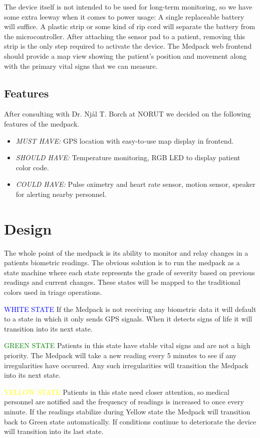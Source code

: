     The device itself is not intended to be used for long-term monitoring, so we have some extra leeway when it comes to power usage: A single replaceable battery will suffice. A plastic strip or some kind of rip cord will separate the battery from the microcontroller. After attaching the sensor pad to a patient, removing this strip is the only step required to activate the device.
    The Medpack web frontend should provide a map view showing the patient's position and movement along with the primary vital signs that we can measure.

    \subsection*{Features}
    After consulting with Dr. Njål T. Borch at NORUT we decided on the following features of the medpack.
    \begin{itemize}
    \item \textit{MUST HAVE:} GPS location with easy-to-use map display in frontend.
    \item \textit{SHOULD HAVE:} Temperature monitoring, RGB LED to display patient color code.
    \item \textit{COULD HAVE:} Pulse oximetry and heart rate sensor, motion sensor, speaker for alerting nearby personnel.
    \end{itemize}

\section*{Design}
The whole point of the medpack is its ability to monitor and relay changes in a patients biometric readings. The obvious solution is to run the medpack as a state machine where each state represents the grade of severity based on previous readings and current changes. These states will be mapped to the traditional colors used in triage operations. 

\textcolor{blue}{WHITE STATE} If the Medpack is not receiving any biometric data it will default to a state in which it only sends GPS signals. When it detects signs of life it will transition into its next state.

\textcolor{green}{GREEN STATE} Patients in this state have stable vital signs and are not a high priority. The Medpack will take a new reading every 5 minutes to see if any irregularities have occurred. Any such irregularities will transition the Medpack into its next state.

\textcolor{yellow}{YELLOW STATE} Patients in this state need closer attention, so medical personnel are notified and the frequency of readings is increased to once every minute. If the readings stabilize during Yellow state the Medpack will transition back to Green state automatically. If conditions continue to deteriorate the device will transition into its last state.

